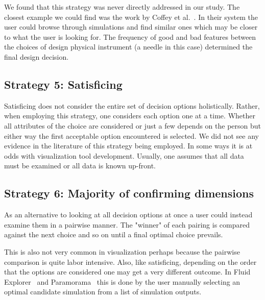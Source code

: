 We found that this strategy was never directly addressed in our study.
The closest example we could find was the work by 
Coffey et al.~\citep{Coffey:2013}. In their system the user could browse
through simulations and find similar ones which may be closer to what
the user is looking for. The frequency of good and bad features between the
choices of design physical instrument (a needle in this case) determined the final design decision.

\subsection{Strategy 5: Satisficing}\label{satisficing}

Satisficing does not consider the entire set of decision options holistically.
Rather, when employing this strategy, one considers each option one at a time.
Whether all attributes of the choice are considered or just a few depends on
the person but either way the first acceptable option encountered is selected.
We did not see any evidence in the literature of this strategy being
employed. In some ways it is at odds with visualization tool development.
Usually, one assumes that all data must be examined or all data is known
up-front.

\subsection{Strategy 6: Majority of confirming
dimensions}\label{majority-of-confirming-dimensions}

As an alternative to looking at all decision options at once a user could 
instead examine them in a pairwise manner. The "winner" of each pairing is
compared against the next choice and so on until a final optimal choice
prevails.

This is also not very common in visualization perhaps because the pairwise
comparison is quite labor intensive. Also, like satisficing, depending on the
order that the options are considered one may get a very different outcome. In
Fluid Explorer~\cite{Bruckner:2010} and Paramorama~\citep{Pretorius:2011} this
is done by the user manually selecting an optimal candidate simulation from 
a list of simulation outputs.

